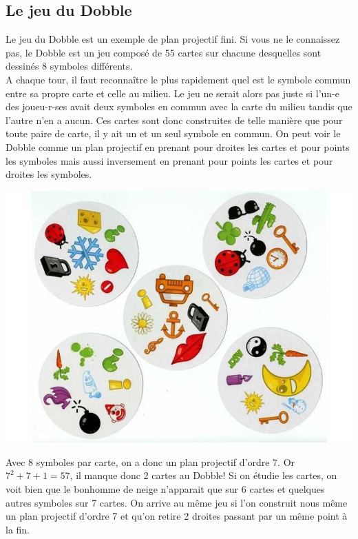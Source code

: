 \documentclass[a4paper]{article}
\begin{document}
\subsection{Le jeu du Dobble}
Le jeu du Dobble est un exemple de plan projectif fini. Si vous ne le connaissez pas, le Dobble est un jeu composé de 55 cartes sur chacune desquelles sont dessinés 8 symboles\vspace{1\baselineskip} différents.\\
  A chaque tour, il faut reconnaître le plus rapidement quel est le symbole commun entre sa propre carte et celle au milieu. Le jeu ne serait alors pas juste si l'un-e des joueu-r-ses avait deux symboles en commun avec la carte du milieu tandis que l'autre n'en a aucun.
  Ces cartes sont donc construites de telle manière que pour toute paire de carte, il y ait un et un seul symbole en commun. On peut voir le Dobble comme un plan projectif en prenant pour droites les cartes et pour points les symboles mais aussi inversement en prenant pour points les cartes et pour droites les symboles.\vspace{1\baselineskip}\\
\begin{center}
\includegraphics[scale=0.3]{dobble-2.jpg}
\end{center}
Avec 8 symboles par carte, on a donc un plan projectif d'ordre 7. Or $7^2+7+1=57$, il manque donc 2 cartes au Dobble! Si on étudie les cartes, on voit bien que le bonhomme de neige n'apparait que sur 6 cartes et quelques autres symboles sur 7 cartes. On arrive au même jeu si l'on construit nous même un plan projectif d'ordre 7 et qu'on retire 2 droites passant par un même point à la fin.
\end{document}
